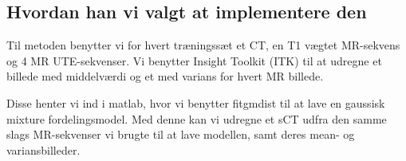 \subsection{Hvordan han vi valgt at implementere den}


Til metoden benytter vi for hvert træningssæt et CT, en T1 vægtet MR-sekvens
og 4 MR UTE-sekvenser. Vi benytter Insight Toolkit (ITK) til at udregne et
billede med middelværdi og et med varians for hvert MR billede.

Disse henter vi ind i matlab, hvor vi benytter fitgmdist til at lave en
gaussisk mixture fordelingsmodel. Med denne kan vi udregne et sCT udfra den
samme slags MR-sekvenser vi brugte til at lave modellen, samt deres
mean- og variansbilleder.

